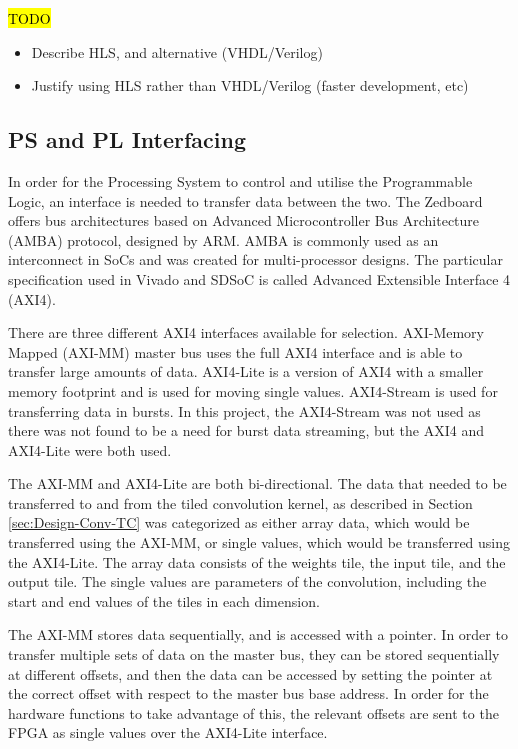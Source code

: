 \documentclass[12pt]{article}
\begin{document}
\hl{TODO}

\begin{itemize}
\item Describe HLS, and alternative (VHDL/Verilog)
\item Justify using HLS rather than VHDL/Verilog (faster development, etc)
\end{itemize}

\subsection{PS and PL Interfacing}
\label{sec:Design-PSnPL}

In order for the Processing System to control and utilise the Programmable Logic, an interface is needed to transfer data between the two. The Zedboard offers bus architectures based on Advanced Microcontroller Bus Architecture (AMBA) protocol, designed by ARM. AMBA is commonly used as an interconnect in SoCs and was created for multi-processor designs. The particular specification used in Vivado and SDSoC is called Advanced Extensible Interface 4 (AXI4). 

There are three different AXI4 interfaces available for selection. AXI-Memory Mapped (AXI-MM) master bus uses the full AXI4 interface and is able to transfer large amounts of data. AXI4-Lite is a version of AXI4 with a smaller memory footprint and is used for moving single values. AXI4-Stream is used for transferring data in bursts. In this project, the AXI4-Stream was not used as there was not found to be a need for burst data streaming, but the AXI4 and AXI4-Lite were both used. 

The AXI-MM and AXI4-Lite are both bi-directional. The data that needed to be transferred to and from the tiled convolution kernel, as described in Section \ref{sec:Design-Conv-TC} was categorized as either array data, which would be transferred using the AXI-MM, or single values, which would be transferred using the AXI4-Lite. The array data consists of the weights tile, the input tile, and the output tile. The single values are parameters of the convolution, including the start and end values of the tiles in each dimension.

The AXI-MM stores data sequentially, and is accessed with a pointer. In order to transfer multiple sets of data on the master bus, they can be stored sequentially at different offsets, and then the data can be accessed by setting the pointer at the correct offset with respect to the master bus base address. In order for the hardware functions to take advantage of this, the relevant offsets are sent to the FPGA as single values over the AXI4-Lite interface.
\end{document}
